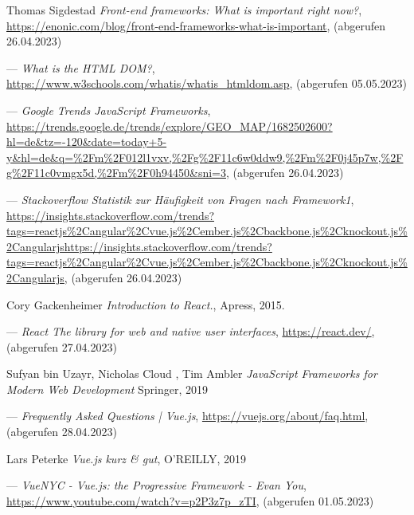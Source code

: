 %

\begin{thebibliography}{99}

    Thomas Sigdestad
	\emph{Front-end frameworks: What is important right now?},
	\url{https://enonic.com/blog/front-end-frameworks-what-is-important},
    (abgerufen 26.04.2023)

	---
	\emph{What is the HTML DOM?},
	\url{https://www.w3schools.com/whatis/whatis_htmldom.asp},
	(abgerufen 05.05.2023)

	---
	\emph{Google Trends JavaScript Frameworks},
	\url{https://trends.google.de/trends/explore/GEO_MAP/1682502600?hl=de&tz=-120&date=today+5-y&hl=de&q=%2Fm%2F012l1vxv,%2Fg%2F11c6w0ddw9,%2Fm%2F0j45p7w,%2Fg%2F11c0vmgx5d,%2Fm%2F0h94450&sni=3},
	(abgerufen 26.04.2023)

	---
	\emph{Stackoverflow Statistik zur Häufigkeit von Fragen nach Framework1},
	\url{https://insights.stackoverflow.com/trends?tags=reactjs%2Cangular%2Cvue.js%2Cember.js%2Cbackbone.js%2Cknockout.js%2Cangularjshttps://insights.stackoverflow.com/trends?tags=reactjs%2Cangular%2Cvue.js%2Cember.js%2Cbackbone.js%2Cknockout.js%2Cangularjs},
	(abgerufen 26.04.2023)

	Cory Gackenheimer
	\emph{Introduction to React.},
	Apress,
	2015.

	---
	\emph{React
	The library for web and native user interfaces},
	\url{https://react.dev/},
	(abgerufen 27.04.2023)

	Sufyan bin Uzayr, Nicholas Cloud , Tim Ambler
	\emph{JavaScript Frameworks for Modern Web Development}
	Springer,
	2019

	---
	\emph{Frequently Asked Questions | Vue.js},
	\url{https://vuejs.org/about/faq.html},
	(abgerufen 28.04.2023)

	Lars Peterke
	\emph{Vue.js kurz \& gut},
	O’REILLY,
	2019

	---
	\emph{VueNYC - Vue.js: the Progressive Framework - Evan You},
	\url{https://www.youtube.com/watch?v=p2P3z7p_zTI},
	(abgerufen 01.05.2023)


\end{thebibliography}

